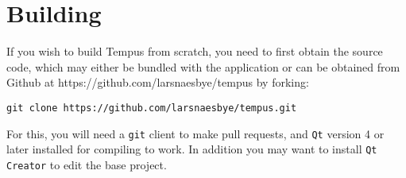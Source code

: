 \section{Building}

If you wish to build Tempus from scratch, you need to first obtain the source code, which may either be bundled with the application or can be obtained from Github at https://github.com/larsnaesbye/tempus by forking:

\texttt{git clone https://github.com/larsnaesbye/tempus.git}

For this, you will need a \texttt{git} client to make pull requests, and \texttt{Qt} version 4 or later installed for compiling to work. In addition you may want to install \texttt{Qt Creator} to edit the base project.

